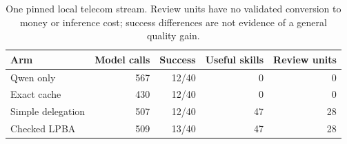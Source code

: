 \begin{table}[H]
\caption{One pinned local telecom stream. Review units have no validated conversion to money or inference cost; success differences are not evidence of a general quality gain.\label{tab:telecom}}
\centering\small\renewcommand{\arraystretch}{1.08}
\begin{tabular}{lrrrr}
\toprule
Arm & Model calls & Success & Useful skills & Review units \\
\midrule
Qwen only & 567 & 12/40 & 0 & 0 \\
Exact cache & 430 & 12/40 & 0 & 0 \\
Simple delegation & 507 & 12/40 & 47 & 28 \\
Checked LPBA & 509 & 13/40 & 47 & 28 \\
\bottomrule
\end{tabular}
\end{table}
